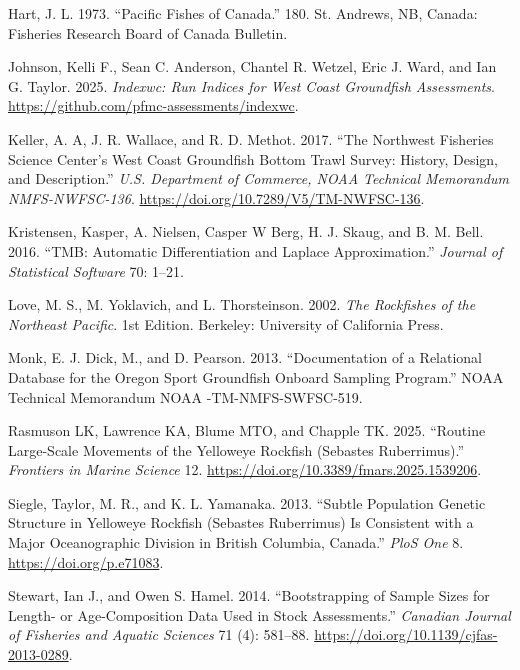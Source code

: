 \documentclass[
]{scrartcl}
\newlength{\cslhangindent}
\newenvironment{CSLReferences}[2] %
 {\begin{list}{}{%
  \setlength{\itemindent}{0pt}
  \setlength{\leftmargin}{0pt}
  \setlength{\parsep}{0pt}
  \ifodd #1
   \setlength{\leftmargin}{\cslhangindent}
   \setlength{\itemindent}{-1\cslhangindent}
  \fi
  \setlength{\itemsep}{#2\baselineskip}}}
 {\end{list}}
\begin{document}
\begin{CSLReferences}{1}{0}
Hart, J. L. 1973. {``Pacific Fishes of {C}anada.''} 180. St. Andrews,
NB, Canada: Fisheries Research Board of Canada Bulletin.

Johnson, Kelli F., Sean C. Anderson, Chantel R. Wetzel, Eric J. Ward,
and Ian G. Taylor. 2025. \emph{Indexwc: Run Indices for West Coast
Groundfish Assessments}.
\url{https://github.com/pfmc-assessments/indexwc}.

Keller, A. A, J. R. Wallace, and R. D. Methot. 2017. {``The Northwest
Fisheries Science Center's West Coast Groundfish Bottom Trawl Survey:
History, Design, and Description.''} \emph{U.S. Department of Commerce,
NOAA Technical Memorandum NMFS-NWFSC-136}.
\url{https://doi.org/10.7289/V5/TM-NWFSC-136}.

Kristensen, Kasper, A. Nielsen, Casper W Berg, H. J. Skaug, and B. M.
Bell. 2016. {``{TMB}: {Automatic} {Differentiation} and {Laplace}
{Approximation}.''} \emph{Journal of Statistical Software} 70: 1--21.

Love, M. S., M. Yoklavich, and L. Thorsteinson. 2002. \emph{The
{Rockfishes} of the {Northeast} {Pacific}}. 1st Edition. Berkeley:
University of California Press.

Monk, E. J. Dick, M., and D. Pearson. 2013. {``Documentation of a
Relational Database for the Oregon Sport Groundfish Onboard Sampling
Program.''} NOAA Technical Memorandum NOAA -TM-NMFS-SWFSC-519.

Rasmuson LK, Lawrence KA, Blume MTO, and Chapple TK. 2025. {``Routine
Large-Scale Movements of the Yelloweye Rockfish (Sebastes
Ruberrimus).''} \emph{Frontiers in Marine Science} 12.
\url{https://doi.org/10.3389/fmars.2025.1539206}.

Siegle, Taylor, M. R., and K. L. Yamanaka. 2013. {``Subtle Population
Genetic Structure in Yelloweye Rockfish (Sebastes Ruberrimus) Is
Consistent with a Major Oceanographic Division in British Columbia,
Canada.''} \emph{PloS One} 8. \url{https://doi.org/p.e71083}.

Stewart, Ian J., and Owen S. Hamel. 2014. {``Bootstrapping of Sample
Sizes for Length- or Age-Composition Data Used in Stock Assessments.''}
\emph{Canadian Journal of Fisheries and Aquatic Sciences} 71 (4):
581--88. \url{https://doi.org/10.1139/cjfas-2013-0289}.


\end{CSLReferences}
\end{document}
